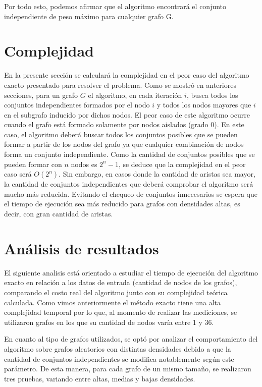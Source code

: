 \documentclass[a4paper,11pt] {article}
\begin{document}
Por todo esto, podemos afirmar que el algoritmo encontrará el conjunto independiente de peso máximo para cualquier grafo G.


\section*{Complejidad}

En la presente secci\'on se calcular\'a la complejidad en el peor caso del algoritmo exacto presentado para resolver el problema. Como se mostr\'o en anteriores secciones, para un grafo $G$ el algoritmo, en cada iteraci\'on $i$, busca todos los conjuntos independientes formados por el nodo $i$ y todos los nodos mayores que $i$ en el subgrafo inducido por dichos nodos. El peor caso de este algoritmo ocurre cuando el grafo est\'a formado solamente por nodos aislados (grado 0). En este caso, el algoritmo deber\'a buscar todos los conjuntos posibles que se pueden formar a partir de los nodos del grafo ya que cualquier combinaci\'on de nodos forma un conjunto independiente. Como la cantidad de conjuntos posibles que se pueden formar con $n$ nodos es $2^{n}-1$, se deduce que la complejidad en el peor caso ser\'a $O(2^{n})$. Sin embargo, en casos donde la cantidad de aristas sea mayor, la cantidad de conjuntos independientes que deber\'a comprobar el algoritmo ser\'a mucho m\'as reducida. Evitando el chequeo de conjuntos innecesarios se espera que el tiempo de ejecuci\'on sea m\'as reducido para grafos con densidades altas, es decir, con gran cantidad de aristas.

\section*{An\'alisis de resultados}

El siguiente analisis est\'a orientado a estudiar el tiempo de ejecuci\'on del algoritmo exacto en relaci\'on a los datos de entrada (cantidad de nodos de los grafos), comparando el costo real del algoritmo junto con su complejidad te\'orica calculada. Como vimos anteriormente el m\'etodo exacto tiene una alta complejidad temporal por lo que, al momento de realizar las mediciones, se utilizaron grafos en los que su cantidad de nodos var\'ia entre 1 y 36.

En cuanto al tipo de grafos utilizados, se opt\'o por analizar el comportamiento del algoritmo sobre grafos aleatorios con distintas densidades debido a que la cantidad de conjuntos independientes se modifica notablemente seg\'un este par\'ametro. De esta manera, para cada grafo de un mismo tama\~{n}o, se realizaron tres pruebas, variando entre altas, medias y bajas densidades.
\end{document}
